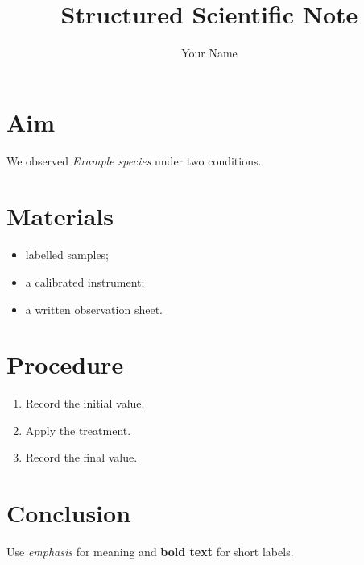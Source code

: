 \documentclass{article}
\title{Structured Scientific Note}
\author{Your Name}
\date{}
\newcommand{\species}[1]{\textit{#1}}
\begin{document}
\maketitle

\section{Aim}
We observed \species{Example species} under two conditions.

\section{Materials}
\begin{itemize}
  \item labelled samples;
  \item a calibrated instrument;
  \item a written observation sheet.
\end{itemize}

\section{Procedure}
\begin{enumerate}
  \item Record the initial value.
  \item Apply the treatment.
  \item Record the final value.
\end{enumerate}

\section{Conclusion}
Use \emph{emphasis} for meaning and \textbf{bold text} for short labels.
\end{document}
